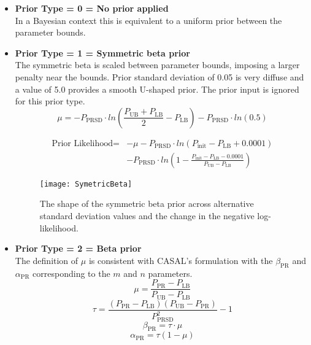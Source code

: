\begin{itemize}
	\item  \textbf{Prior Type = 0 = No prior applied} \\ 
	In a Bayesian context this is equivalent to a uniform prior between the parameter bounds.
	
	\item  \textbf{Prior Type = 1 = Symmetric beta prior} \\ 
	The symmetric beta is scaled between parameter bounds, imposing a larger penalty near the bounds.  Prior standard deviation of 0.05 is very diffuse and a value of 5.0 provides a smooth U-shaped prior. The prior input is ignored for this prior type.
	\begin{equation} 
		\mu = -P_\text{PRSD} \cdot ln\left(\frac{P_\text{UB}+P_\text{LB}}{2} - P_\text{LB} \right) - P_\text{PRSD} \cdot ln(0.5)
	\end{equation}
	
	\begin{equation}
		\begin{split}
			\text{Prior Likelihood} = & -\mu -P_\text{PRSD} \cdot ln\left(P_\text{init}-P_\text{LB}+0.0001\right) \\
			& - P_\text{PRSD} \cdot ln\left(1-\frac{P_\text{init}-P_\text{LB}-0.0001}{P_\text{UB}-P_\text{LB}}\right)
		\end{split}
	\end{equation}

	\begin{figure}[h]
	\begin{center}
		\texttt{[image: SymetricBeta]}\\
	\end{center}
	\caption{The shape of the symmetric beta prior across alternative standard deviation values and the change in the negative log-likelihood.}
	\end{figure}	

	
	\item \textbf{Prior Type = 2 = Beta prior}  \\ 
	The definition of $\mu$ is consistent with CASAL's formulation with the $\beta_\text{PR}$ and $\alpha_\text{PR}$ corresponding to the $m$ and $n$ parameters.
	\begin{equation}
		\mu = \frac{P_\text{PR}-P_\text{LB}}{P_\text{UB}-P_\text{LB}} 
	\end{equation}
	\begin{equation}
		\tau  = \frac{(P_\text{PR}-P_\text{LB})(P_\text{UB}-P_\text{PR})}{P_\text{PRSD}^2}-1
	\end{equation}
	\begin{equation}
		\beta_\text{PR}  = \tau \cdot \mu
	\end{equation}
	\begin{equation}
		\alpha_\text{PR} = \tau (1-\mu)
	\end{equation}
	

\end{itemize}

